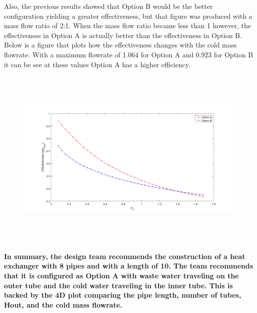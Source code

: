 %
\noindent
Also, the previous results showed that Option B would be the better configuration yielding a greater effectiveness, but that figure was produced with a mass flow ratio of 2:1. When the mass flow ratio became less than 1 however, the effectiveness in Option A is actually better than the effectiveness in Option B. Below is a figure that plots how the effectiveness changes with the cold mass flowrate. With a maximum flowrate of 1.064 for Option A and 0.923 for Option B it can be see at these values Option A has a higher efficiency.
%
%
%
%
\begin{figure}[H]
    \centering
    \includegraphics[height=3.5in]{pictures/part_5_eff_cross.png}
\end{figure}
%
\noindent
\textbf{In summary, the design team recommends the construction of a heat exchanger with 8 pipes and with a length of 10. The team recommends that it is configured as Option A with waste water traveling on the outer tube and the cold water traveling in the inner tube. This is backed by the 4D plot comparing the pipe length, number of tubes, Hout, and the cold mass flowrate.}


